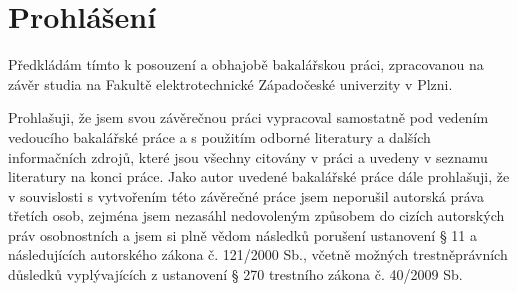 \chapter*{Prohlášení}
Předkládám tímto k posouzení a obhajobě bakalářskou práci, zpracovanou na závěr studia na Fakultě elektrotechnické Západočeské univerzity v Plzni.

Prohlašuji, že jsem svou závěrečnou práci vypracoval samostatně pod vedením vedoucího bakalářské práce a s použitím odborné literatury a dalších informačních zdrojů, které jsou všechny citovány v práci a uvedeny v seznamu literatury na konci práce. Jako autor uvedené bakalářské práce dále prohlašuji, že v souvislosti s vytvořením této závěrečné práce jsem neporušil autorská práva třetích osob, zejména jsem nezasáhl nedovoleným způsobem do cizích autorských práv osobnostních a jsem si plně vědom následků po\-ru\-še\-ní ustanovení § 11 a následujících autorského zákona č. 121/2000 Sb., včetně možných trestněprávních důsledků vyplývajících z ustanovení § 270 trestního zákona č. 40/2009 Sb.